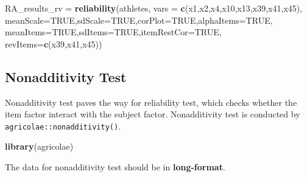 \documentclass[
]{ctexart}
\newenvironment{Shaded}{\begin{snugshade}}{\end{snugshade}}
\newcommand{\AttributeTok}[1]{\textcolor[rgb]{0.13,0.29,0.53}{#1}}
\newcommand{\ConstantTok}[1]{\textcolor[rgb]{0.56,0.35,0.01}{#1}}
\newcommand{\FunctionTok}[1]{\textcolor[rgb]{0.13,0.29,0.53}{\textbf{#1}}}
\newcommand{\NormalTok}[1]{#1}
\newcommand{\OtherTok}[1]{\textcolor[rgb]{0.56,0.35,0.01}{#1}}
\newcommand{\StringTok}[1]{\textcolor[rgb]{0.31,0.60,0.02}{#1}}
\begin{document}
\begin{Shaded}
\begin{Highlighting}[]
\NormalTok{RA\_results\_rv }\OtherTok{=} \FunctionTok{reliability}\NormalTok{(athletes,}
                            \AttributeTok{vars =} \FunctionTok{c}\NormalTok{(}\StringTok{\textquotesingle{}x1\textquotesingle{}}\NormalTok{,}\StringTok{\textquotesingle{}x2\textquotesingle{}}\NormalTok{,}\StringTok{\textquotesingle{}x4\textquotesingle{}}\NormalTok{,}\StringTok{\textquotesingle{}x10\textquotesingle{}}\NormalTok{,}\StringTok{\textquotesingle{}x13\textquotesingle{}}\NormalTok{,}\StringTok{\textquotesingle{}x39\textquotesingle{}}\NormalTok{,}\StringTok{\textquotesingle{}x41\textquotesingle{}}\NormalTok{,}\StringTok{\textquotesingle{}x45\textquotesingle{}}\NormalTok{),}
                            \AttributeTok{meanScale=}\ConstantTok{TRUE}\NormalTok{,}\AttributeTok{sdScale=}\ConstantTok{TRUE}\NormalTok{,}\AttributeTok{corPlot=}\ConstantTok{TRUE}\NormalTok{,}\AttributeTok{alphaItems=}\ConstantTok{TRUE}\NormalTok{,}
                            \AttributeTok{meanItems=}\ConstantTok{TRUE}\NormalTok{,}\AttributeTok{sdItems=}\ConstantTok{TRUE}\NormalTok{,}\AttributeTok{itemRestCor=}\ConstantTok{TRUE}\NormalTok{,}
                            \AttributeTok{revItems=}\FunctionTok{c}\NormalTok{(}\StringTok{\textquotesingle{}x39\textquotesingle{}}\NormalTok{,}\StringTok{\textquotesingle{}x41\textquotesingle{}}\NormalTok{,}\StringTok{\textquotesingle{}x45\textquotesingle{}}\NormalTok{))}
\end{Highlighting}
\end{Shaded}

\hypertarget{nonadditivity-test}{%
\subsection{Nonadditivity Test}\label{nonadditivity-test}}

Nonadditivity test paves the way for reliability test, which checks
whether the item factor interact with the subject factor. Nonadditivity
test is conducted by \texttt{agricolae::nonadditivity()}.

\begin{Shaded}
\begin{Highlighting}[]
\FunctionTok{library}\NormalTok{(agricolae)}
\end{Highlighting}
\end{Shaded}

The data for nonadditivity test should be in \textbf{long-format}.
\end{document}
